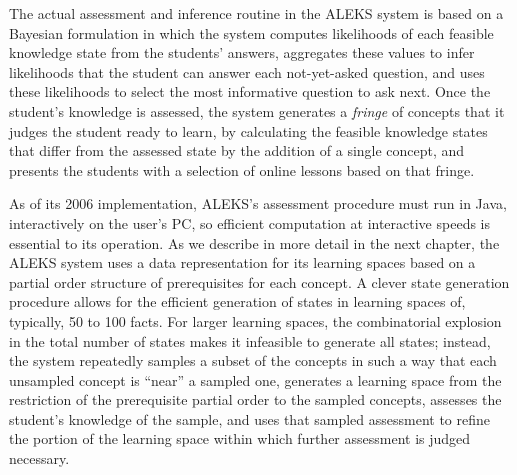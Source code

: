 \documentclass[11pt]{llncs}
\begin{document}
{The actual assessment and inference routine in the ALEKS system is based on a Bayesian formulation in which the system computes likelihoods of each feasible knowledge state from the students' answers, aggregates these values to infer likelihoods that the student can answer each not-yet-asked question, and uses these likelihoods to select the most informative question to ask next. Once the student's knowledge is assessed, the system generates a \emph{fringe} of concepts that it judges the student ready to learn, by calculating the feasible knowledge states that differ from the assessed state by the addition of a single concept, and presents the students with a selection of online lessons based on that fringe.

As of its 2006 implementation, ALEKS's assessment procedure must run in Java, interactively on the user's PC, so efficient computation at interactive speeds is essential to its operation. As we describe in more detail in the next chapter, the ALEKS system uses a data representation for its learning spaces based on a partial order structure of prerequisites for each concept. A clever state generation procedure allows for the efficient generation of states in learning spaces of, typically, 50 to 100 facts. For larger learning spaces, the combinatorial explosion in the total number of states makes it infeasible to generate all states; instead, the system repeatedly samples a subset of the concepts in such a way that each unsampled concept is ``near'' a sampled one, generates a learning space from the restriction of the prerequisite partial order to the sampled concepts, assesses the student's knowledge of the sample, and uses that sampled assessment to refine the portion of the learning space within which further assessment is judged necessary.

}
\end{document}

